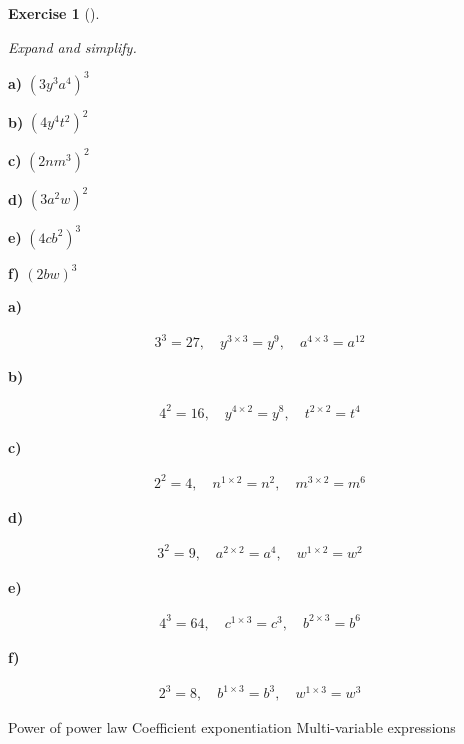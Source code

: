 \documentclass[
  letterpaper,
  DIV=11,
  numbers=noendperiod]{scrreprt}
\theoremstyle{definition}
\newtheorem{exercise}{Exercise}[chapter]
\theoremstyle{remark}
\begin{document}
\begin{exercise}[]\protect\hypertarget{exr-u2-10}{}\label{exr-u2-10}

\emph{Expand and simplify.}

\textbf{a)} \(\displaystyle (3y^{3}a^{4})^{3}\)

\textbf{b)} \(\displaystyle (4y^{4}t^{2})^{2}\)

\textbf{c)} \(\displaystyle (2nm^{3})^{2}\)

\textbf{d)} \(\displaystyle (3a^{2}w)^{2}\)

\textbf{e)} \(\displaystyle (4cb^{2})^{3}\)

\textbf{f)} \(\displaystyle (2bw)^{3}\)

\begin{tcolorbox}[enhanced jigsaw, opacitybacktitle=0.6, coltitle=black, arc=.35mm, colframe=quarto-callout-tip-color-frame, colback=white, bottomrule=.15mm, left=2mm, colbacktitle=quarto-callout-tip-color!10!white, titlerule=0mm, opacityback=0, title=\textcolor{quarto-callout-tip-color}{\faLightbulb}\hspace{0.5em}{🔍 View Solutions}, leftrule=.75mm, breakable, rightrule=.15mm, bottomtitle=1mm, toptitle=1mm, toprule=.15mm]

\textbf{a)}

\[
\begin{aligned}
3^{3}=27,\quad y^{3\times 3}=y^{9},\quad a^{4\times 3}=a^{12}
\end{aligned}
\]

\textbf{b)}

\[
\begin{aligned}
4^{2}=16,\quad y^{4\times 2}=y^{8},\quad t^{2\times 2}=t^{4}
\end{aligned}
\]

\textbf{c)}

\[
\begin{aligned}
2^{2}=4,\quad n^{1\times 2}=n^{2},\quad m^{3\times 2}=m^{6}
\end{aligned}
\]

\textbf{d)}

\[
\begin{aligned}
3^{2}=9,\quad a^{2\times 2}=a^{4},\quad w^{1\times 2}=w^{2}
\end{aligned}
\]

\textbf{e)}

\[
\begin{aligned}
4^{3}=64,\quad c^{1\times 3}=c^{3},\quad b^{2\times 3}=b^{6}
\end{aligned}
\]

\textbf{f)}

\[
\begin{aligned}
2^{3}=8,\quad b^{1\times 3}=b^{3},\quad w^{1\times 3}=w^{3}
\end{aligned}
\]

\end{tcolorbox}

{Power of power law} {Coefficient exponentiation} {Multi-variable
expressions}

\end{exercise}
\end{document}
